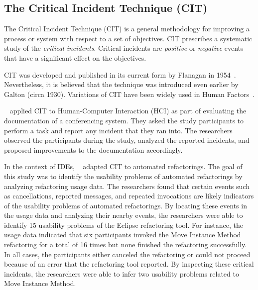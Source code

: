 
 
\subsection{The Critical Incident Technique (CIT)}

The Critical Incident Technique (CIT) is a general methodology for improving a
process or system with respect to a set of objectives. CIT prescribes a
systematic study of the \emph{critical incidents}. Critical incidents are
\emph{positive} or \emph{negative} events that have a significant effect on the
objectives.

CIT was developed and published in its current form by Flanagan in
1954~\cite{Flanagan1954CIT}. Nevertheless, it is believed that the technique was
introduced even earlier by Galton (circa 1930). Variations of CIT have been
widely used in Human Factors~\cite{ShattuckWoods1994CIT}.

~ applied CIT to Human-Computer Interaction (HCI) as part
of evaluating the documentation of a conferencing system.
They asked the study participants to perform a task and report any incident that
they ran into. The researchers observed the participants during the study,
analyzed the reported incidents, and proposed improvements to the documentation
accordingly.

In the context of IDEs, ~ adapted CIT to automated
refactorings. The goal of this study was to
identify the usability problems of automated refactorings by analyzing
refactoring usage data. The researchers found that certain events such as
cancellations, reported messages, and repeated invocations are likely indicators
of the usability problems of automated refactorings. By locating these events in
the usage data and analyzing their nearby events, the researchers were able to
identify 15 usability problems of the Eclipse refactoring tool. For instance,
the usage data indicated that six participants invoked the Move Instance Method
refactoring for a total of 16 times but none finished the refactoring
successfully. In all cases, the participants either canceled the refactoring or
could not proceed because of an error that the refactoring tool reported. By
inspecting these critical incidents, the researchers were able to infer two
usability problems related to Move Instance Method.

